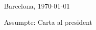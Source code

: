 \documentclass[a4paper,12pt]{article}
\begin{document}
\hspace*{\fill} Barcelona, \today
\vspace*{1.5cm}
	
Assumpte: Carta al president
\end{document}
